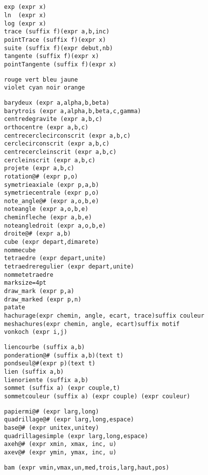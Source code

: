 \documentclass{article}
\begin{document}
\begin{multicols}{3}
\newpage

\section{\MP}

\begin{Verbatim}
  exp (expr x)
  ln  (expr x)
  log (expr x)
  trace (suffix f)(expr a,b,inc)
  pointTrace (suffix f)(expr x)
  suite (suffix f)(expr debut,nb)
  tangente (suffix f)(expr x)
  pointTangente (suffix f)(expr x)
\end{Verbatim}

\begin{Verbatim}
  rouge vert bleu jaune
  violet cyan noir orange
\end{Verbatim}
\columnbreak
{}
\begin{Verbatim}
  barydeux (expr a,alpha,b,beta)
  barytrois (expr a,alpha,b,beta,c,gamma)
  centredegravite (expr a,b,c)
  orthocentre (expr a,b,c)
  centrecerclecirconscrit (expr a,b,c)
  cerclecirconscrit (expr a,b,c)
  centrecercleinscrit (expr a,b,c)
  cercleinscrit (expr a,b,c)
  projete (expr a,b,c)
  rotation@# (expr p,o)
  symetrieaxiale (expr p,a,b)
  symetriecentrale (expr p,o)
  note_angle@# (expr a,o,b,e)
  noteangle (expr a,o,b,e)
  cheminfleche (expr a,b,e)
  noteangledroit (expr a,o,b,e)
  droite@# (expr a,b)
  cube (expr depart,dimarete)
  nommecube
  tetraedre (expr depart,unite)
  tetraedreregulier (expr depart,unite)
  nommetetraedre
  marksize=4pt
  draw_mark (expr p,a)
  draw_marked (expr p,n)
  patate
  hachurage(expr chemin, angle, ecart, trace)suffix couleur
  meshachures(expr chemin, angle, ecart)suffix motif
  vonkoch (expr i,j)
\end{Verbatim}

\begin{Verbatim}
  liencourbe (suffix a,b)
  ponderation@# (suffix a,b)(text t)
  pondseul@#(expr p)(text t)
  lien (suffix a,b)
  lienoriente (suffix a,b)
  sommet (suffix a) (expr couple,t)
  sommetcouleur (suffix a) (expr couple) (expr couleur)
\end{Verbatim}

\begin{Verbatim}
  papiermi@# (expr larg,long)
  quadrillage@# (expr larg,long,espace)
  base@# (expr unitex,unitey)
  quadrillagesimple (expr larg,long,espace)
  axeh@# (expr xmin, xmax, inc, u)
  axev@# (expr ymin, ymax, inc, u)
\end{Verbatim}

\begin{Verbatim}
  bam (expr vmin,vmax,un,med,trois,larg,haut,pos)
  
\end{Verbatim}
\end{multicols}
\end{document}
